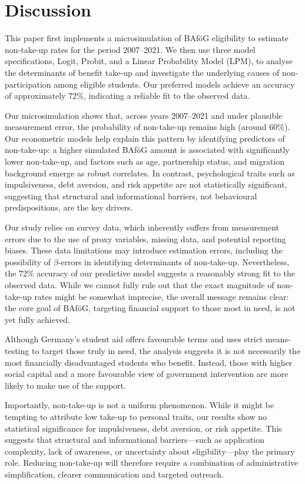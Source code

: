 \section{Discussion}
This paper first implements a microsimulation of BAföG eligibility to estimate non-take-up rates for the period 2007–2021. 
We then use three model specifications, Logit, Probit, and a Linear Probability Model (LPM), to analyse the determinants of benefit take-up and investigate the underlying causes of non-participation among eligible students. 
Our preferred models achieve an accuracy of approximately 72\%, indicating a reliable fit to the observed data.


Our microsimulation shows that, across years 2007–2021 and under plausible measurement error, the probability of non-take-up remains high (around 60\%). 
Our econometric models help explain this pattern by identifying predictors of non-take-up: a higher simulated BAföG amount is associated with significantly lower non-take-up, and factors such as age, partnership status, and migration background emerge as robust correlates. 
In contrast, psychological traits such as impulsiveness, debt aversion, and risk appetite are not statistically significant, suggesting that structural and informational barriers, not behavioural predispositions, are the key drivers.

Our study relies on survey data, which inherently suffers from measurement errors due to the use of proxy variables, missing data, and potential reporting biases. 
These data limitations may introduce estimation errors, including the possibility of \( \beta \)-errors in identifying determinants of non-take-up. 
Nevertheless, the 72\% accuracy of our predictive model suggests a reasonably strong fit to the observed data. 
While we cannot fully rule out that the exact magnitude of non-take-up rates might be somewhat imprecise, the overall message remains clear: the core goal of BAföG, targeting financial support to those most in need, is not yet fully achieved.

Although Germany’s student aid offers favourable terms and uses strict means-testing to target those truly in need, the analysis suggests it is not necessarily the most financially disadvantaged students who benefit. 
Instead, those with higher social capital and a more favourable view of government intervention are more likely to make use of the support.

Importantly, non-take-up is not a uniform phenomenon. 
While it might be tempting to attribute low take-up to personal traits, our results show no statistical significance for impulsiveness, debt aversion, or risk appetite. 
This suggests that structural and informational barriers—such as application complexity, lack of awareness, or uncertainty about eligibility—play the primary role. 
Reducing non-take-up will therefore require a combination of administrative simplification, clearer communication and targeted outreach.

